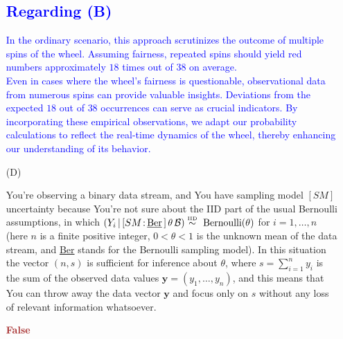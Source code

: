 \documentclass[12pt]{article}
\newcommand{\given}{\, | \,}
\renewcommand{\r}[1]{\text{#1}}
\renewcommand{\u}[1]{\underline{#1}}
\begin{document}
\begin{itemize}
\subsection*{\textcolor{blue}{\textbf{Regarding (B)}}}
\textcolor{blue}{
In the ordinary scenario, this approach scrutinizes the outcome of multiple spins of the wheel. Assuming fairness, repeated spins should yield red numbers approximately \textcolor{blue}{\(18\)} times out of \textcolor{blue}{\(38\)} on average.
\\
Even in cases where the wheel's fairness is questionable, observational data from numerous spins can provide valuable insights. Deviations from the expected \textcolor{blue}{\(18\)} out of \textcolor{blue}{\(38\)} occurrences can serve as crucial indicators. By incorporating these empirical observations, we adapt our probability calculations to reflect the real-time dynamics of the wheel, thereby enhancing our understanding of its behavior.
}
\item[(D)]

You're observing a binary data stream, and You have sampling model $[ SM ]$ uncertainty because You're not sure about the IID part of the usual Bernoulli assumptions, in which $( Y_i \given [ SM \colon \! \r{\u{Ber}} \, ] \, \theta \, \mathcal B ) \stackrel{ \textrm{\tiny IID} }{ \sim } \textrm{ Bernoulli} ( \theta )$ for $i = 1, \dots, n$ (here $n$ is a finite positive integer, $0 < \theta < 1$ is the unknown mean of the data stream, and \u{Ber} stands for the Bernoulli sampling model). In this situation the vector $( n, s )$ is sufficient for inference about $\theta$, where $s = \sum_{ i = 1 }^n y_i$ is the sum of the observed data values $\bm{ y } = ( y_1, \dots, y_n )$, and this means that You can throw away the data vector $\bm{ y }$ and focus only on $s$ without any loss of relevant information whatsoever.



\textcolor{brown}{\textbf{False}}


\end{itemize}
\end{document}
